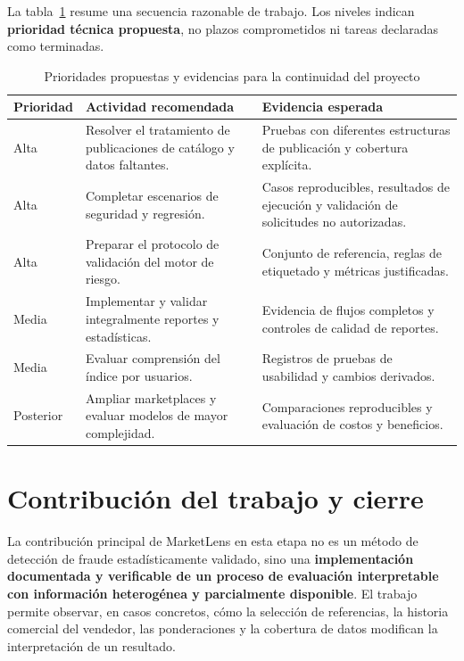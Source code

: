 La tabla~\ref{tab:ml-prioridades-futuras} resume una secuencia razonable de trabajo. Los niveles indican \textbf{prioridad técnica propuesta}, no plazos comprometidos ni tareas declaradas como terminadas.

\begin{table}[htbp]
    \centering
    \caption{Prioridades propuestas y evidencias para la continuidad del proyecto}
    \label{tab:ml-prioridades-futuras}
    \scriptsize
    \begin{tabularx}{\textwidth}{@{}p{1.45cm} X X@{}}
        \toprule
        \textbf{Prioridad} & \textbf{Actividad recomendada} & \textbf{Evidencia esperada} \\
        \midrule
        Alta & Resolver el tratamiento de publicaciones de catálogo y datos faltantes. & Pruebas con diferentes estructuras de publicación y cobertura explícita. \\
        Alta & Completar escenarios de seguridad y regresión. & Casos reproducibles, resultados de ejecución y validación de solicitudes no autorizadas. \\
        Alta & Preparar el protocolo de validación del motor de riesgo. & Conjunto de referencia, reglas de etiquetado y métricas justificadas. \\
        Media & Implementar y validar integralmente reportes y estadísticas. & Evidencia de flujos completos y controles de calidad de reportes. \\
        Media & Evaluar comprensión del índice por usuarios. & Registros de pruebas de usabilidad y cambios derivados. \\
        Posterior & Ampliar marketplaces y evaluar modelos de mayor complejidad. & Comparaciones reproducibles y evaluación de costos y beneficios. \\
        \bottomrule
    \end{tabularx}
\end{table}

\section{Contribución del trabajo y cierre}\label{sec:ml-cierre}

La contribución principal de MarketLens en esta etapa no es un método de detección de fraude estadísticamente validado, sino una \textbf{implementación documentada y verificable de un proceso de evaluación interpretable con información heterogénea y parcialmente disponible}. El trabajo permite observar, en casos concretos, cómo la selección de referencias, la historia comercial del vendedor, las ponderaciones y la cobertura de datos modifican la interpretación de un resultado.

